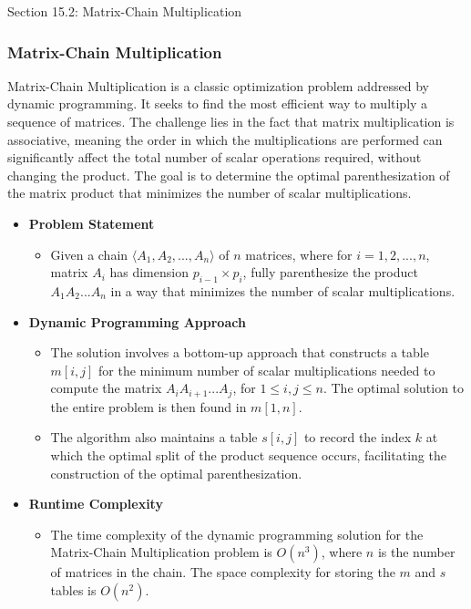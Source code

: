 \begin{notes}{Section 15.2: Matrix-Chain Multiplication}
    \subsubsection*{Matrix-Chain Multiplication}

    Matrix-Chain Multiplication is a classic optimization problem addressed by dynamic programming. It seeks to find the most efficient way to multiply a sequence of matrices. The challenge lies in the 
    fact that matrix multiplication is associative, meaning the order in which the multiplications are performed can significantly affect the total number of scalar operations required, without changing 
    the product. The goal is to determine the optimal parenthesization of the matrix product that minimizes the number of scalar multiplications.
    
    \begin{itemize}
        \item \textbf{Problem Statement}
        \begin{itemize}
            \item Given a chain $\langle A_1, A_2, ..., A_n \rangle$ of $n$ matrices, where for $i = 1, 2, ..., n$, matrix $A_i$ has dimension $p_{i-1} \times p_i$, fully parenthesize the product 
            $A_1A_2...A_n$ in a way that minimizes the number of scalar multiplications.
        \end{itemize}
        
        \item \textbf{Dynamic Programming Approach}
        \begin{itemize}
            \item The solution involves a bottom-up approach that constructs a table $m[i,j]$ for the minimum number of scalar multiplications needed to compute the matrix $A_iA_{i+1}...A_j$, for 
            $1 \leq i, j \leq n$. The optimal solution to the entire problem is then found in $m[1,n]$.
            \item The algorithm also maintains a table $s[i,j]$ to record the index $k$ at which the optimal split of the product sequence occurs, facilitating the construction of the optimal parenthesization.
        \end{itemize}
        
        \item \textbf{Runtime Complexity}
        \begin{itemize}
            \item The time complexity of the dynamic programming solution for the Matrix-Chain Multiplication problem is $O(n^3)$, where $n$ is the number of matrices in the chain. The space complexity 
            for storing the $m$ and $s$ tables is $O(n^2)$.
        \end{itemize}
    \end{itemize}
    

\end{notes}

